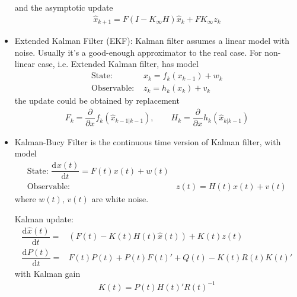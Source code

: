 \begin{itemize}[topsep=2pt,itemsep=0pt]
    and the asymptotic update
    \begin{align*}
        \hat{x}_{k+1}=F\left(I-K_\infty H\right)\hat{x}_k+ FK_\infty z_k 
    \end{align*}
    
    \item Extended Kalman Filter (EKF): Kalman filter assumes a linear model with noise. Usually it's a good-enough approximator to the real case. For non-linear case, i.e. Extended Kalman filter, has model
    \begin{align*}
         \text{State: }&x_k=f_k(x_{k-1})+w_k\\
         \text{Observable: }&z_k=h_k(x_k)+v_k
    \end{align*}
    the update could be obtained by replacement
    \begin{align*}
         F_k=\dfrac{\partial^{}  }{\partial x ^{}}f_k\left(\hat{x}_{k-1|k-1}\right),\qquad H_k=\dfrac{\partial^{} }{\partial x^{}}h_k\left(\hat{x}_{k|k-1}\right)
    \end{align*}
    \item Kalman-Bucy Filter is the continuous time version of Kalman filter, with model
    \begin{align*}
        \text{State: }\dfrac{\mathrm{d}^{} x(t)}{\mathrm{d}t^{}}=F(t)x(t)+w(t)\\
        \text{Observable: }&z(t)=H(t)x(t)+v(t)
    \end{align*}
    where $ w(t),\,v(t) $ are white noise.

    Kalman update:
    \begin{align*}
        \dfrac{\mathrm{d}^{} \hat{x}(t)}{\mathrm{d}t^{}}=&\left( F(t)-K(t)H(t)\hat{x}(t) \right)+K(t)z(t)\\
        \dfrac{\mathrm{d}^{}P(t) }{\mathrm{d}t}=&F(t)P(t)+P(t)F(t)'+Q(t)-K(t)R(t)K(t)'
    \end{align*}
    with Kalman gain
    \begin{align*}
        K(t)=P(t)H(t)'R(t)^{-1} 
    \end{align*}
    
    
\end{itemize}

    




 









